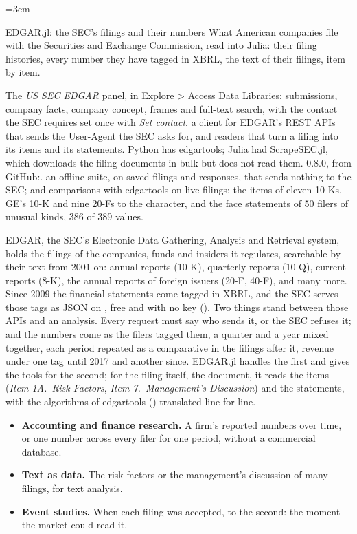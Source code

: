 \emergencystretch=3em

  {EDGAR.jl: the SEC's filings and their numbers}
  {What American companies file with the Securities and Exchange Commission, read into Julia: their filing
   histories, every number they have tagged in XBRL, the text of their filings, item by item.}

\factsheet
  {The \emph{US SEC EDGAR} panel, in Explore > Access Data Libraries: submissions, company facts, company
   concept, frames and full-text search, with the contact the SEC requires set once with \emph{Set contact}.}
  {a client for EDGAR's REST APIs that sends the User-Agent the SEC asks for, and readers that turn a filing into
   its items and its statements. Python has edgartools; Julia had ScrapeSEC.jl, which downloads the filing
   documents in bulk but does not read them.}
  { 0.8.0, from GitHub:\newline {}.}
  {an offline suite, on saved filings and responses, that sends nothing to the SEC; and comparisons with
   edgartools on live filings: the items of eleven 10-Ks, GE's 10-K and nine 20-Fs to the character, and the face
   statements of 50 filers of unusual kinds, 386 of 389 values.}

EDGAR, the SEC's Electronic Data Gathering, Analysis and Retrieval system, holds the filings of the companies,
funds and insiders it regulates, searchable by their text from 2001 on: annual reports (10-K), quarterly reports (10-Q), current reports
(8-K), the annual reports of foreign issuers (20-F, 40-F), and many more. Since 2009 the financial statements
come tagged in XBRL, and the SEC serves those tags as JSON on , free and with no key
(). Two things stand between those APIs and an analysis. Every request must say
who sends it, or the SEC refuses it; and the numbers come as the filers tagged them, a quarter and a year mixed
together, each period repeated as a comparative in the filings after it, revenue under one tag until 2017 and
another since. EDGAR.jl handles the first and gives the tools for the second; for the filing itself, the
document, it reads the items (\emph{Item 1A.\ Risk Factors}, \emph{Item 7.\ Management's Discussion}) and the
statements, with the algorithms of edgartools () translated line for
line.

\begin{itemize}
  \item \textbf{Accounting and finance research.} A firm's reported numbers over time, or one number across
    every filer for one period, without a commercial database.
  \item \textbf{Text as data.} The risk factors or the management's discussion of many filings, for text
    analysis.
  \item \textbf{Event studies.} When each filing was accepted, to the second: the moment the market could read
    it.
\end{itemize}

